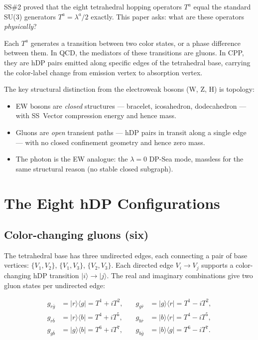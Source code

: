 \documentclass[11pt,a4paper]{article}
\newcommand{\ket}[1]{|#1\rangle}
\newcommand{\bra}[1]{\langle#1|}
\begin{document}
SS\#2 \citep{cpp_ss2} proved that the eight tetrahedral hopping
operators $T^a$ equal the standard SU(3) generators $T^a =
\lambda^a/2$ exactly.  This paper asks: what are these operators
\emph{physically}?

Each $T^a$ generates a transition between two color states, or a
phase difference between them.  In QCD, the mediators of these
transitions are gluons.  In CPP, they are hDP pairs emitted along
specific edges of the tetrahedral base, carrying the color-label
change from emission vertex to absorption vertex.

The key structural distinction from the electroweak bosons (W, Z, H)
is topology:
\begin{itemize}
\item EW bosons are \emph{closed} structures --- bracelet, icosahedron,
  dodecahedron --- with SS~Vector compression energy and hence mass.
\item Gluons are \emph{open} transient paths --- hDP pairs in transit
  along a single edge --- with no closed confinement geometry and
  hence zero mass.
\item The photon is the EW analogue: the $\lambda = 0$ DP-Sea mode,
  massless for the same structural reason (no stable closed subgraph).
\end{itemize}

\section{The Eight hDP Configurations}

\subsection{Color-changing gluons (six)}

The tetrahedral base has three undirected edges, each connecting
a pair of base vertices:
$\{V_1, V_2\}$, $\{V_1, V_3\}$, $\{V_2, V_3\}$.
Each directed edge $V_i \to V_j$ supports a color-changing hDP
transition $\ket{i} \to \ket{j}$.  The real and imaginary
combinations give two gluon states per undirected edge:

\begin{align}
g_{r\bar{g}} &= \ket{r}\!\bra{g}
= T^1 + iT^2,\quad&
g_{g\bar{r}} &= \ket{g}\!\bra{r}
= T^1 - iT^2, \label{eq:g12}\\
g_{r\bar{b}} &= \ket{r}\!\bra{b}
= T^4 + iT^5,\quad&
g_{b\bar{r}} &= \ket{b}\!\bra{r}
= T^4 - iT^5, \label{eq:g13}\\
g_{g\bar{b}} &= \ket{g}\!\bra{b}
= T^6 + iT^7,\quad&
g_{b\bar{g}} &= \ket{b}\!\bra{g}
= T^6 - iT^7. \label{eq:g23}
\end{align}
\end{document}
